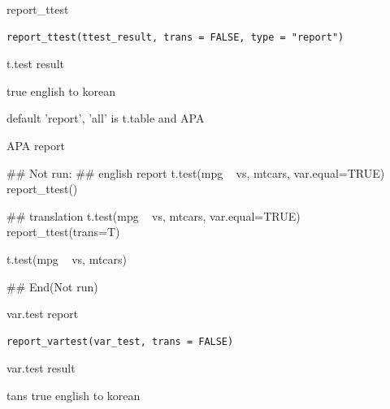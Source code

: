 \documentclass[a4paper]{book}
\begin{document}
%
\begin{Description}
report\_ttest
\end{Description}
%
\begin{Usage}
\begin{verbatim}
report_ttest(ttest_result, trans = FALSE, type = "report")
\end{verbatim}
\end{Usage}
%
\begin{Arguments}
\begin{ldescription}
\item[\code{ttest\_result}] t.test result

\item[\code{trans}] true english to korean

\item[\code{type}] default 'report', 'all' is t.table and APA
\end{ldescription}
\end{Arguments}
%
\begin{Value}
APA report
\end{Value}
%
\begin{Examples}
\begin{ExampleCode}
\#\# Not run: 
## english report
t.test(mpg ~ vs, mtcars, var.equal=TRUE) %
        report_ttest()

## translation
t.test(mpg ~ vs, mtcars, var.equal=TRUE) %
report_ttest(trans=T)

t.test(mpg ~ vs, mtcars) %

## End(Not run)
\end{ExampleCode}
\end{Examples}
%
\begin{Description}
var.test report
\end{Description}
%
\begin{Usage}
\begin{verbatim}
report_vartest(var_test, trans = FALSE)
\end{verbatim}
\end{Usage}
%
\begin{Arguments}
\begin{ldescription}
\item[\code{var\_test}] var.test result

\item[\code{trans}] tans true english to korean
\end{ldescription}
\end{Arguments}
\end{document}

